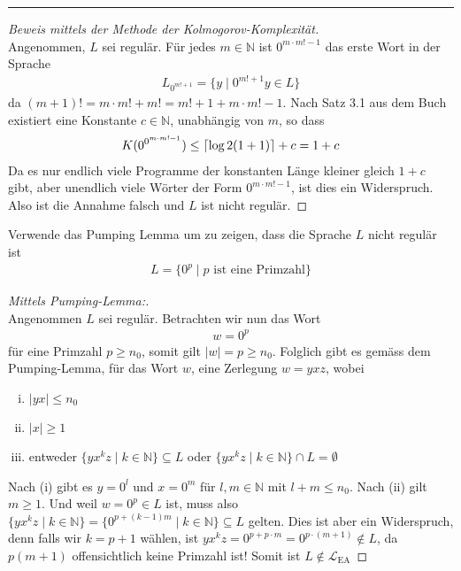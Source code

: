 \documentclass[a4paper,ngerman,12pt]{exam}
\DeclarePairedDelimiter\ceil{\lceil}{\rceil}
\begin{document}
\begin{questions}
\begin{solutionorbox}[22em]
      \hrule

      \begin{proof}[Beweis mittels der Methode der Kolmogorov-Komplexität] $ $\\
        Angenommen, $L$ sei regulär. Für jedes $m \in \mathbb{N}$ ist $0^{m\cdot m! - 1}$
  das erste Wort in der Sprache
  \begin{align*}
    L_{0^{m! + 1}} = \{y \mid 0^{m!+1}y \in L\}
  \end{align*}
        da $(m+1)! = m\cdot m! + m! = m! + 1 + m\cdot m! -1$.
Nach Satz 3.1 aus dem Buch existiert eine Konstante $c \in \mathbb{N}$,
unabhängig von $m$, so dass
  \begin{align*}
    K(0^{0^{m\cdot m! - 1}}) \leq \ceil{\log 2 (1 + 1)} + c = 1 + c
  \end{align*}
Da es nur endlich viele Programme der konstanten Länge kleiner gleich $1 + c$ gibt,
aber unendlich viele Wörter der Form $0^{m\cdot m! - 1}$, ist dies ein Widerspruch.
Also ist die Annahme falsch
und $L$ ist nicht regulär.
      \end{proof}
    \end{solutionorbox}
\question
   Verwende das Pumping Lemma um zu zeigen, dass die Sprache $L$ nicht regulär ist
    \begin{align*}
      L = \{0^{p} \mid p \text{ ist eine Primzahl}\}
    \end{align*}
     \vspace{-2em}
    \begin{solutionorbox}[20em]
      \begin{proof}[Mittels Pumping-Lemma:] $ $\\
        Angenommen $L$ sei regulär. Betrachten wir nun das Wort
        \begin{align*}
          w = 0^{p}
        \end{align*}
        für eine Primzahl $p \geq n_0$,
        somit gilt $|w| = p \geq n_0$.
        Folglich gibt es gemäss dem Pumping-Lemma, für das Wort $w$, eine Zerlegung
        $w = yxz$, wobei
        \begin{enumerate}[(i)]
          \item $|yx| \leq n_0$
          \item $|x| \geq 1$
          \item entweder $\{y x^k z \mid k \in \mathbb{N}\} \subseteq L$
            oder $\{y x^k z \mid k \in \mathbb{N}\} \cap L = \emptyset$
        \end{enumerate}
        Nach (i) gibt es $y = 0^l$ und $x = 0^m$ für $l,m \in \mathbb{N}$
        mit $l+m \leq n_0$. Nach (ii) gilt $m \geq 1$. Und weil
        $w = 0^{p} \in L$ ist, muss also
        $\{y x^k z \mid k \in \mathbb{N}\} = \{0^{p + (k-1)m} \mid k \in \mathbb{N}\} \subseteq L$ gelten. Dies ist aber ein
        Widerspruch, denn falls wir $k=p+1$ wählen, ist
        $yx^kz = 0^{p+p\cdot m} = 0^{p\cdot (m+1)} \not\in L$, da
        $p(m+1)$ offensichtlich keine Primzahl ist!
        Somit ist
        $L \not\in \mathcal{L}_{\mathrm{EA}}$
      \end{proof}
    \end{solutionorbox}
\end{questions}
\end{document}
